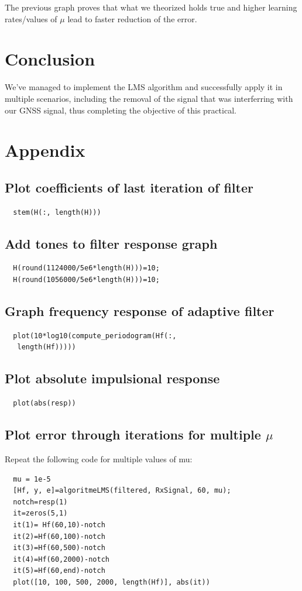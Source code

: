 \documentclass[conference,9pt]{IEEEtran}
\begin{document}
The previous graph proves that what we theorized holds true and higher learning rates/values of $\mu$ lead to faster reduction of the error.

\section{Conclusion}
We've managed to implement the LMS algorithm and successfully apply it in multiple scenarios, including the removal of the signal that was interferring with our GNSS signal, thus completing the objective of this practical.

\section{Appendix}
\subsection{Plot coefficients of last iteration of filter}
\begin{verbatim}
  stem(H(:, length(H)))
\end{verbatim}

\subsection{Add tones to filter response graph}
\begin{verbatim}
  H(round(1124000/5e6*length(H)))=10;
  H(round(1056000/5e6*length(H)))=10;
\end{verbatim}

\subsection{Graph frequency response of adaptive filter}
\begin{verbatim}
  plot(10*log10(compute_periodogram(Hf(:,
   length(Hf)))))
\end{verbatim}

\subsection{Plot absolute impulsional response}
\begin{verbatim}
  plot(abs(resp))
\end{verbatim}

\subsection{Plot error through iterations for multiple $\mu$}
Repeat the following code for multiple values of mu:
\begin{verbatim}
  mu = 1e-5
  [Hf, y, e]=algoritmeLMS(filtered, RxSignal, 60, mu);
  notch=resp(1)
  it=zeros(5,1)
  it(1)= Hf(60,10)-notch
  it(2)=Hf(60,100)-notch
  it(3)=Hf(60,500)-notch
  it(4)=Hf(60,2000)-notch
  it(5)=Hf(60,end)-notch
  plot([10, 100, 500, 2000, length(Hf)], abs(it))
\end{verbatim}
\end{document}
